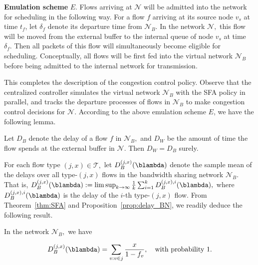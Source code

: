 \smallskip

\noindent\textbf{Emulation scheme} $E$. Flows arriving at $\mathcal{N}$ will
be admitted into the network for scheduling in the following way.
For a flow $f$ arriving at its source node $v_{s}$ at time $t_{f}$,
let $\delta_{f}$ denote its departure time from \textbf{$\mathcal{N}_{B}$}.
In the network $\mathcal{N},$ this flow will be moved from the external buffer to the internal queue of node $v_{s}$ at time $\delta_{f}.$
Then all packets of this flow will simultaneously become eligible
for scheduling. Conceptually, all flows will be first fed into the
virtual network \textbf{$\mathcal{N}_{B}$ }before being admitted
to the internal network for transmission. 

\smallskip
This completes the description of the congestion control policy. Observe that the centralized controller simulates the virtual network $\mathcal{N}_{B}$ with the SFA policy in parallel, and tracks the departure processes of flows in $\mathcal{N}_{B}$ to make congestion control decisions for $\mathcal{N}$. According to the above emulation scheme $E$, we have the following lemma.
\begin{lem}
\label{lem:delay_flow_congestion}Let $D_{B}$ denote the delay of
a flow $f$ in $\mathcal{N}_{B},$ and $D_{W}$ be the amount of time
the flow spends at the external buffer in $\mathcal{N}$. Then
$D_{W}=D_{B}$ surely. 
\end{lem}



For each flow type $(j,x)\in\mathcal{T},$ let $D_{B}^{(j,x)} (\blambda)$ denote
the sample mean of the delays over all type-$(j,x)$ flows in the bandwidth
sharing network $\mathcal{N}_{B}.$ That is, $D_{B}^{(j,x)} (\blambda) := \limsup_{k\rightarrow\infty}\frac{1}{k}\sum_{i=1}^{k}D_{B}^{(j,x),i} (\blambda),$
where $D_{B}^{(j,x),i} (\blambda)$ is the delay of the $i$-th type-$(j,x)$
flow. From Theorem~\ref{thm:SFA} and Proposition~\ref{prop:delay_BN}, we readily deduce the following
result.

\begin{prop}
\label{prop:delay_SFA}In the network $\mathcal{\mathcal{N}}_{B},$
we have 

\[
D_{B}^{(j,x)} (\blambda)=\sum_{v:v\in j}\frac{x}{1-f_{v}},\quad\text{with probability \ensuremath{1.}}
\]
\end{prop}

